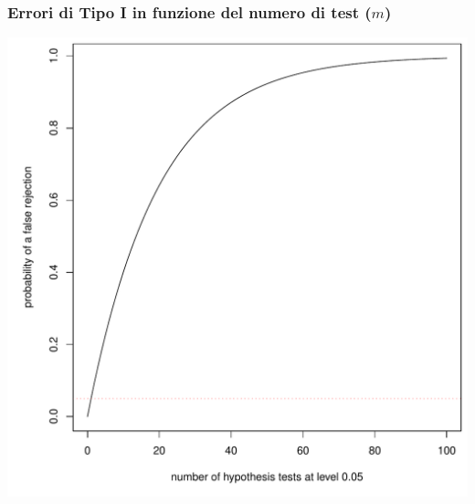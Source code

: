 \documentclass[xcolor={pdftex,dvipsnames,table}]{beamer}
\newcommand{\bfr}[1]{\begin{frame} \frametitle{#1}}
\begin{document}
\bfr{Errori di Tipo I in funzione del numero di test ($m$)}%
\includegraphics[scale=.3]{plaatjes/typeI}
\end{frame}

\end{document}
